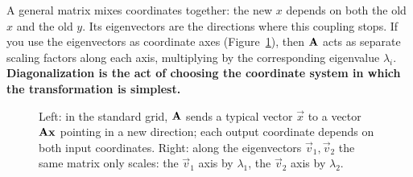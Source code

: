 \begin{intuitionbox}
A general matrix mixes coordinates together: the new $x$ depends on both the old
$x$ and the old $y$. Its eigenvectors are the directions where this coupling
stops. If you use the eigenvectors as coordinate axes (Figure~\ref{ch24:fig-eigenview}),
then $\mathbf{A}$ acts as separate scaling factors along each axis, multiplying by the
corresponding eigenvalue $\lambda_i$. \textbf{Diagonalization is the act of choosing
the coordinate system in which the transformation is simplest.}
\end{intuitionbox}

\begin{figure}[H]
\centering
{}
\caption{Left: in the standard grid, $\mathbf{A}$ sends a typical vector $\vec{x}$
to a vector $\mathbf{A}\mathbf{x}$ pointing in a new direction; each output coordinate
depends on both input coordinates. Right: along the eigenvectors
$\vec{v}_1,\vec{v}_2$ the same matrix only scales: the $\vec{v}_1$ axis by
$\lambda_1$, the $\vec{v}_2$ axis by $\lambda_2$.}
\label{ch24:fig-eigenview}
\end{figure}

